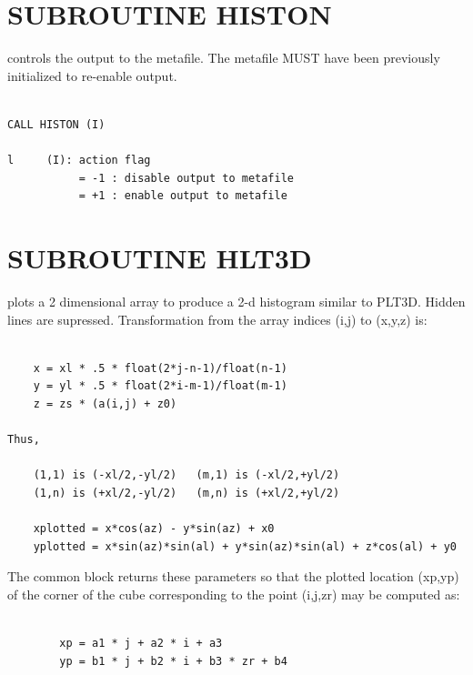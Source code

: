 \documentclass[11pt]{report}
\begin{document}
\section{SUBROUTINE HISTON}

 controls the output to the metafile.  The metafile MUST have been
previously initialized to re-enable output.
\begin{verbatim}

CALL HISTON (I)

l     (I): action flag
           = -1 : disable output to metafile
           = +1 : enable output to metafile

\end{verbatim}

\section{SUBROUTINE HLT3D}

 plots a 2 dimensional array to produce a 2-d histogram similar
to PLT3D.  Hidden lines are supressed.
Transformation from the array indices (i,j) to (x,y,z) is:
\begin{verbatim}

    x = xl * .5 * float(2*j-n-1)/float(n-1)
    y = yl * .5 * float(2*i-m-1)/float(m-1)
    z = zs * (a(i,j) + z0)

Thus,

    (1,1) is (-xl/2,-yl/2)   (m,1) is (-xl/2,+yl/2)
    (1,n) is (+xl/2,-yl/2)   (m,n) is (+xl/2,+yl/2)

    xplotted = x*cos(az) - y*sin(az) + x0
    yplotted = x*sin(az)*sin(al) + y*sin(az)*sin(al) + z*cos(al) + y0
\end{verbatim}

The common block  returns these  parameters so
that the plotted location (xp,yp) of the corner of the cube corresponding
to the point (i,j,zr) may be computed as:
\begin{verbatim}

        xp = a1 * j + a2 * i + a3
        yp = b1 * j + b2 * i + b3 * zr + b4
\end{verbatim}
\end{document}
